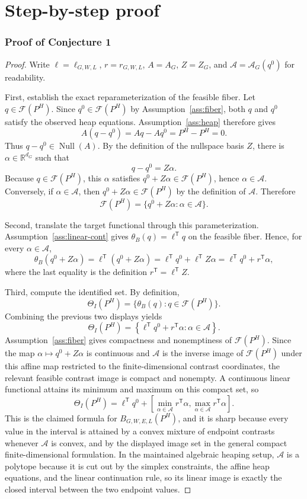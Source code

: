 \documentclass[11pt]{article}
\newcommand{\transpose}{\mathsf{T}}
\theoremstyle{definition}
\theoremstyle{plain}
\theoremstyle{remark}
\begin{document}
\section{Step-by-step proof}
\subsubsection*{Proof of Conjecture 1}
\begin{proof}
Write \(\ell=\ell_{G,W,L}\), \(r=r_{G,W,L}\), \(A=A_G\), \(Z=Z_G\), and \(\mathcal{A}=\mathcal{A}_G(q^0)\) for readability.

First, establish the exact reparameterization of the feasible fiber.  Let \(q\in\mathcal{F}(P^H)\).  Since \(q^0\in\mathcal{F}(P^H)\) by Assumption~\ref{ass:fiber}, both \(q\) and \(q^0\) satisfy the observed heap equations.  Assumption~\ref{ass:heap} therefore gives
\[
A(q-q^0)=Aq-Aq^0=P^H-P^H=0.
\]
Thus \(q-q^0\in\operatorname{Null}(A)\).  By the definition of the nullspace basis \(Z\), there is \(\alpha\in\mathbb{R}^{d_G}\) such that
\[
q-q^0=Z\alpha.
\]
Because \(q\in\mathcal{F}(P^H)\), this \(\alpha\) satisfies \(q^0+Z\alpha\in\mathcal{F}(P^H)\), hence \(\alpha\in\mathcal{A}\).  Conversely, if \(\alpha\in\mathcal{A}\), then \(q^0+Z\alpha\in\mathcal{F}(P^H)\) by the definition of \(\mathcal{A}\).  Therefore
\[
\mathcal{F}(P^H)=\{q^0+Z\alpha:\alpha\in\mathcal{A}\}.
\]

Second, translate the target functional through this parameterization.  Assumption~\ref{ass:linear-cont} gives \(\theta_B(q)=\ell^{\transpose}q\) on the feasible fiber.  Hence, for every \(\alpha\in\mathcal{A}\),
\[
\theta_B(q^0+Z\alpha)
=\ell^{\transpose}(q^0+Z\alpha)
=\ell^{\transpose}q^0+\ell^{\transpose}Z\alpha
=\ell^{\transpose}q^0+r^{\transpose}\alpha,
\]
where the last equality is the definition \(r^{\transpose}=\ell^{\transpose}Z\).

Third, compute the identified set.  By definition,
\[
\Theta_I(P^H)=\{\theta_B(q):q\in\mathcal{F}(P^H)\}.
\]
Combining the previous two displays yields
\[
\Theta_I(P^H)
=
\left\{\ell^{\transpose}q^0+r^{\transpose}\alpha:
\alpha\in\mathcal{A}\right\}.
\]
Assumption~\ref{ass:fiber} gives compactness and nonemptiness of \(\mathcal{F}(P^H)\).  Since the map \(\alpha\mapsto q^0+Z\alpha\) is continuous and \(\mathcal{A}\) is the inverse image of \(\mathcal{F}(P^H)\) under this affine map restricted to the finite-dimensional contrast coordinates, the relevant feasible contrast image is compact and nonempty.  A continuous linear functional attains its minimum and maximum on this compact set, so
\[
\Theta_I(P^H)=
\ell^{\transpose}q^0+
\left[
\min_{\alpha\in\mathcal{A}}r^{\transpose}\alpha,
\max_{\alpha\in\mathcal{A}}r^{\transpose}\alpha
\right].
\]
This is the claimed formula for \(B_{G,W,E,L}(P^H)\), and it is sharp because every value in the interval is attained by a convex mixture of endpoint contrasts whenever \(\mathcal{A}\) is convex, and by the displayed image set in the general compact finite-dimensional formulation.  In the maintained algebraic heaping setup, \(\mathcal{A}\) is a polytope because it is cut out by the simplex constraints, the affine heap equations, and the linear continuation rule, so its linear image is exactly the closed interval between the two endpoint values.


\end{proof}
\end{document}
